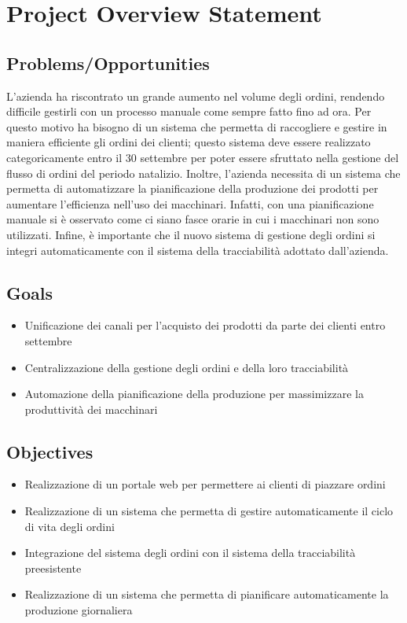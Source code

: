 \chapter{Project Overview Statement}
\label{app:pos}

\section{Problems/Opportunities}
L'azienda ha riscontrato un grande aumento nel volume degli ordini, rendendo difficile gestirli con un processo manuale come sempre fatto fino ad ora.
Per questo motivo ha bisogno di un sistema che permetta di raccogliere e gestire in maniera efficiente gli ordini dei clienti; questo sistema deve essere realizzato categoricamente entro il 30 settembre per poter essere sfruttato nella gestione del flusso di ordini del periodo natalizio. Inoltre, l'azienda necessita di un sistema che permetta di automatizzare la pianificazione della produzione dei prodotti per aumentare l'efficienza nell'uso dei macchinari. Infatti, con una pianificazione manuale si è osservato come ci siano fasce orarie in cui i macchinari non sono utilizzati.
Infine, è importante che il nuovo sistema di gestione degli ordini si integri automaticamente con il sistema della tracciabilità adottato dall'azienda.

\section{Goals}
\begin{itemize}
  \item Unificazione dei canali per l'acquisto dei prodotti da parte dei clienti entro settembre
  \item Centralizzazione della gestione degli ordini e della loro tracciabilità
  \item Automazione della pianificazione della produzione per massimizzare la produttività dei macchinari
\end{itemize}

\section{Objectives}
\begin{itemize}
  \item Realizzazione di un portale web per permettere ai clienti di piazzare ordini
  \item Realizzazione di un sistema che permetta di gestire automaticamente il ciclo di vita degli ordini
  \item Integrazione del sistema degli ordini con il sistema della tracciabilità preesistente
  \item Realizzazione di un sistema che permetta di pianificare automaticamente la produzione giornaliera
\end{itemize}

